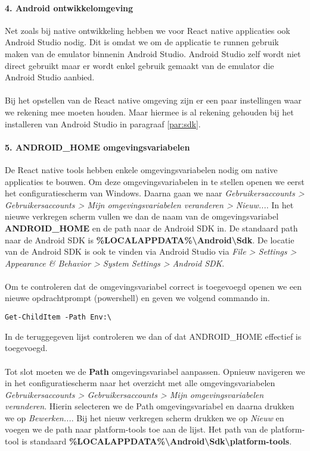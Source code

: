 \paragraph{4. Android ontwikkelomgeving}
Net zoals bij native ontwikkeling hebben we voor React native applicaties ook Android Studio nodig. 
Dit is omdat we om de applicatie te runnen gebruik maken van de emulator binnenin Android Studio. 
Android Studio zelf wordt niet direct gebruikt maar er wordt enkel gebruik gemaakt van de 
emulator die Android Studio aanbied.
\\\\
Bij het opstellen van de React native omgeving zijn er een paar instellingen waar we rekening 
mee moeten houden. Maar hiermee is al rekening gehouden bij het installeren van Android Studio 
in paragraaf \ref{par:sdk}.

\paragraph{5. ANDROID\_HOME omgevingsvariabelen}
De React native tools hebben enkele omgevingsvariabelen nodig om native applicaties te bouwen. 
Om deze omgevingsvariabelen in te stellen openen we eerst het configuratiescherm van Windows. 
Daarna gaan we naar 
\textit{Gebruikersaccounts > Gebruikersaccounts > Mijn omgevingsvariabelen veranderen > Nieuw...}. 
In het nieuwe verkregen scherm vullen we dan de naam van de omgevingsvariabel \textbf{ANDROID\_HOME} 
en de path naar de Android SDK in. De standaard path naar de Android SDK is 
\textbf{\%LOCALAPPDATA\%\backslash Android\backslash Sdk}. 
De locatie van de Android SDK is ook te vinden via Android Studio via 
\textit{File > Settings > Appearance \& Behavior > System Settings > Android SDK}.
\\\\
Om te controleren dat de omgevingsvariabel correct is toegevoegd openen we een nieuwe 
opdrachtprompt (powershell) en geven we volgend commando in.
\begin{verbatim}
Get-ChildItem -Path Env:\
\end{verbatim}
In de teruggegeven lijst controleren we dan of dat ANDROID\_HOME effectief is toegevoegd.
\\\\
Tot slot moeten we de \textbf{Path} omgevingsvariabel aanpassen. 
Opnieuw navigeren we in het configuratiescherm naar het overzicht met alle omgevingsvariabelen 
\textit{Gebruikersaccounts > Gebruikersaccounts > Mijn omgevingsvariabelen veranderen}. 
Hierin selecteren we de Path omgevingsvariabel en daarna drukken we op \textit{Bewerken...}. 
Bij het nieuw verkregen scherm drukken we op \textit{Nieuw} en voegen we de path naar platform-tools 
toe aan de lijst. Het path van de platform-tool is standaard 
\textbf{\%LOCALAPPDATA\%\backslash Android\backslash Sdk\backslash platform-tools}.

